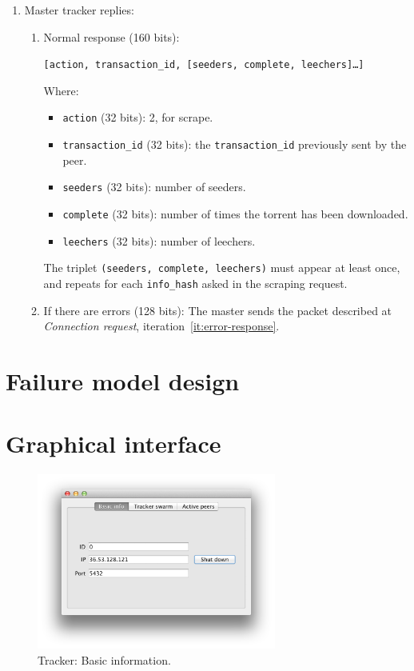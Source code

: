 \documentclass[twoside,a4paper,10pt]{article}
\begin{document}
\begin{itemize}
\begin{itemize}
\begin{enumerate}
    \item Master tracker replies:

      \begin{enumerate}
      \item Normal response (160 bits):

        \texttt{[action, transaction\_id, [seeders, complete, leechers]\ldots]}

        Where:
        \begin{itemize}
        \item \texttt{action} (32 bits): 2, for scrape.
        \item \texttt{transaction\_id} (32 bits): the \texttt{transaction\_id}
          previously sent by the peer.
        \item \texttt{seeders} (32 bits): number of seeders.
        \item \texttt{complete} (32 bits): number of times the torrent has
          been downloaded.
        \item \texttt{leechers} (32 bits): number of leechers.
        \end{itemize}

        The triplet \texttt{(seeders, complete, leechers)} must appear at least
        once, and repeats for each \texttt{info\_hash} asked in the scraping
        request.
        
      \item If there are errors (128 bits): The master sends the packet
        described at \emph{Connection request},
        iteration~\ref{it:error-response}.
      \end{enumerate}
    \end{enumerate}
  \end{itemize}
\end{itemize}

\section{Failure model design}

\section{Graphical interface}

\begin{figure}[!htp]
  \centering
  \includegraphics[width=0.7\textwidth]{imgs/tracker/basicInfo.png}
  \caption{\label{fig:basicInfo}Tracker: Basic information.}
\end{figure}
\end{document}
